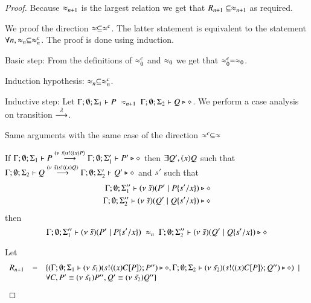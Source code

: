 \begin{proof}
	Because $\approx_{n+1}$ is the largest relation we get that $R_{n+1} \subseteq \approx_{n+1}$ as required.
	\vspace{3mm}


	We proof the direction $\approx \subseteq \approx^{c}$.
	The latter statement is equivalent to the statement $\forall n, \approx_n \subseteq \approx^{c}_n$.
	The proof is done using induction.

	Basic step: From the definitions of $\approx^{c}_0$ and $\approx_0$ we get that $\approx^{c}_0 = \approx_0$.

	Induction hypothesis: $\approx_n \subseteq \approx^{c}_n$.

	Inductive step: Let $\Gamma; \emptyset; \Sigma_1 \vdash P\ \approx_{n+1}\ \Gamma; \emptyset; \Sigma_2 \vdash Q \triangleright \diamond$.
	We perform a case analysis on transition $\stackrel{\lambda}{\longrightarrow}$.

	Same arguments with the same case of the direction $\approx^{c} \subseteq \approx$


	If $\Gamma; \emptyset; \Sigma_1 \vdash P \stackrel{(\nu\ \tilde{s}) s ! \langle (x)P \rangle}{\longrightarrow} \Gamma; \emptyset; \Sigma_1' \vdash P' \triangleright \diamond$ then
	$\exists Q', (x)Q$ such that
	$\Gamma; \emptyset; \Sigma_2 \vdash Q \stackrel{(\nu\ \tilde{s}) s ! \langle (x)Q \rangle}{\longrightarrow} \Gamma; \emptyset; \Sigma_2' \vdash Q' \triangleright \diamond$
	and $s'$
	such that
	\begin{eqnarray*}
		\Gamma; \emptyset; \Sigma_1'' \vdash (\nu\ \tilde{s})(P' \;|\; P \{s'/x \}) \triangleright \diamond \\
		\Gamma; \emptyset; \Sigma_2'' \vdash (\nu\ \tilde{s})(Q' \;|\; Q \{s'/x \}) \triangleright \diamond
	\end{eqnarray*}
	then
	\[
		\Gamma; \emptyset; \Sigma_1'' \proves \newsp{\tilde{s}}{P' \Par P \subst{s'}{x}}\ \wb_{n}\ 
		\Gamma; \emptyset; \Sigma_2'' \proves \newsp{\tilde{s}}{Q' \Par Q \subst{s'}{x}} \hastype \Proc
	\]

	Let
	\[
		\begin{array}{rcl}
			R_{n + 1} &=& \{	(\Gamma; \emptyset; \Sigma_1 \vdash (\nu\ \tilde{s_1})(s ! \langle (x)C[P] \rangle ; P'') \triangleright \diamond,
						\Gamma; \emptyset; \Sigma_2 \vdash (\nu\ \tilde{s_2})(s ! \langle (x)C[P] \rangle ; Q'') \triangleright \diamond) \ \ |\ \ \\
				& &		\forall C, P' \equiv (\nu\ \tilde{s_1}) P'', Q' \equiv (\nu\ \tilde{s_2}) Q''\}
		\end{array}
	\]


\end{proof}
